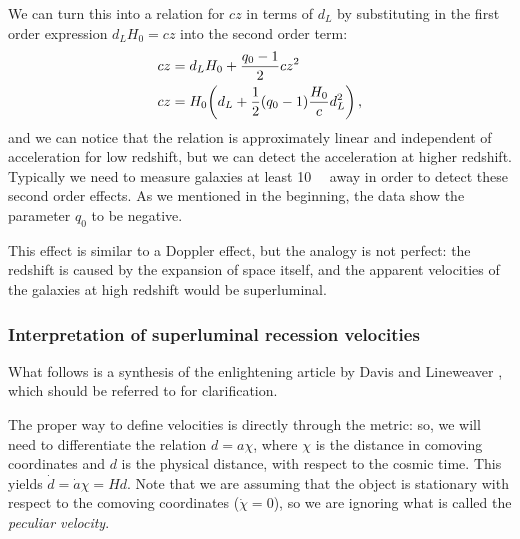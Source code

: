 \documentclass[main.tex]{subfiles}
\begin{document}
We can turn this into a relation for \(cz\) in terms of \(d_L\) by substituting in the first order expression \(d_L H_0 = cz\) into the second order term:
\begin{align}
cz &= d_L H_0 + \frac{q_0 -1}{2} cz^2 \\
cz &= H_0 \qty(d_L + \frac{1}{2} (q_0 -1 ) \frac{H_0}{c} d_L^2)\,,
\end{align}
%
and we can notice that the relation is approximately linear and independent of acceleration for low redshift, but we can detect the acceleration at higher redshift.
Typically we need to measure galaxies at least \SI{10}{\mega\parsec} away in order to detect these second order effects.
As we mentioned in the beginning, the data show the parameter \(q_0 \) to be negative.

This effect is similar to a Doppler effect, but the analogy is not perfect: the redshift is caused by the expansion of space itself, and the apparent velocities of the galaxies at high redshift would be superluminal. 

\subsubsection{Interpretation of superluminal recession velocities}

What follows is a synthesis of the enlightening article by Davis and Lineweaver \cite[]{davisExpandingConfusionCommon2004}, which should be referred to for clarification.

The proper way to define velocities is directly through the metric: so, we will need to differentiate the relation \(d = a \chi \), where \(\chi \) is the distance in comoving coordinates and \(d\) is the physical distance, with respect to the cosmic time. This yields \(\dot{d} = \dot{a} \chi = H d\).
Note that we are assuming that the object is stationary with respect to the comoving coordinates (\(\dot{\chi} = 0\)), so we are ignoring what is called the \emph{peculiar velocity}. 
\end{document}

